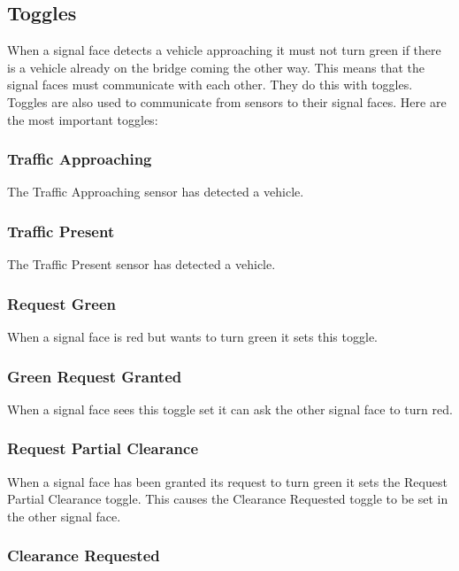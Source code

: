 \documentclass[letterpaper,twoside]{article}
\begin{document}
\subsection{Toggles}

When a signal face detects a vehicle approaching it must not turn green
if there is a vehicle already on the bridge coming the other way.
This means that the signal faces must communicate with each other.
They do this with toggles.  Toggles are also used to communicate
from sensors to their signal faces.  Here are the most important toggles:

\subsubsection{Traffic Approaching}

The Traffic Approaching sensor has detected a vehicle.

\subsubsection{Traffic Present}

The Traffic Present sensor has detected a vehicle.

\subsubsection{Request Green}

When a signal face is red but wants to turn green it sets this toggle.

\subsubsection{Green Request Granted}

When a signal face sees this toggle set it can ask the other signal
face to turn red.

\subsubsection{Request Partial Clearance}

When a signal face has been granted its request to turn green it sets
the Request Partial Clearance toggle.  This causes the Clearance Requested
toggle to be set in the other signal face.

\subsubsection{Clearance Requested}
\end{document}

